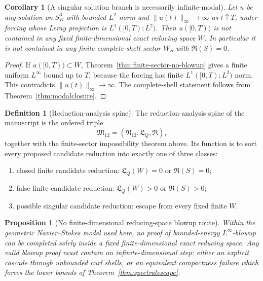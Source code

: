 \documentclass[aps,prd,reprint,superscriptaddress,nofootinbib,floatfix]{revtex4-2}
\newtheorem{proposition}[theorem]{Proposition}
\newtheorem{corollary}[theorem]{Corollary}
\theoremstyle{definition}
\newtheorem{definition}[theorem]{Definition}
\theoremstyle{remark}
\begin{document}
\begin{corollary}[A singular solution branch is necessarily infinite-modal]
	\label{cor:singular-branch-infinite-modal}
	Let \(u\) be any solution on \(S^3_R\) with bounded \(L^2\) norm and \(\|u(t)\|_\infty\to\infty\) as \(t\uparrow T\), under forcing whose Leray projection is \(L^1([0,T);L^2)\).  Then \(u([0,T))\) is not contained in any fixed finite-dimensional exact reducing space \(W\).  In particular it is not contained in any finite complete-shell sector \(W_S\) with \(\mathfrak R(S)=0\).
\end{corollary}

\begin{proof}
	If \(u([0,T))\subset W\), Theorem~\ref{thm:finite-sector-no-blowup} gives a finite uniform \(L^\infty\) bound up to \(T\), because the forcing has finite \(L^1([0,T);L^2)\) norm.  This contradicts \(\|u(t)\|_\infty\to\infty\).  The complete-shell statement follows from Theorem~\ref{thm:modalclosure}.
\end{proof}

\begin{definition}[Reduction-analysis spine]
	The reduction-analysis spine of the manuscript is the ordered triple
	\[
		\mathfrak M_{12}=(\mathfrak N_{12},\mathfrak L_Q,\mathfrak R),
	\]
	together with the finite-sector impossibility theorem above.  Its function is to sort every proposed candidate reduction into exactly one of three classes:
	\begin{enumerate}[label=(\alph*),leftmargin=*]
		\item closed finite candidate reduction: \(\mathfrak L_Q(W)=0\) or \(\mathfrak R(S)=0\);
		\item false finite candidate reduction: \(\mathfrak L_Q(W)>0\) or \(\mathfrak R(S)>0\);
		\item possible singular candidate reduction: escape from every fixed finite \(W\).
	\end{enumerate}
\end{definition}

\begin{proposition}[No finite-dimensional reducing-space blowup route]
	\label{prop:no-finite-reducing-route}
	Within the geometric Navier--Stokes model used here, no proof of bounded-energy \(L^\infty\)-blowup can be completed solely inside a fixed finite-dimensional exact reducing space.  Any valid blowup proof must contain an infinite-dimensional step: either an explicit cascade through unbounded curl shells, or an equivalent compactness failure which forces the lower bounds of Theorem~\ref{thm:spectralescape}.
\end{proposition}
\end{document}
